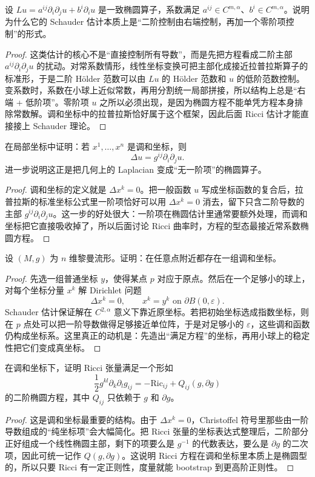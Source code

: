 \documentclass[11pt,a4paper,openany]{ctexbook}
\numberwithin{equation}{chapter}
\begin{document}
\begin{problem}
设 \(L u=a^{ij}\partial_i\partial_j u+b^i\partial_i u\) 是一致椭圆算子，系数满足 \(a^{ij}\in C^{m,\alpha}\)、\(b^i\in C^{m,\alpha}\)。说明为什么它的 Schauder 估计本质上是“二阶控制由右端控制，再加一个零阶项控制”的形式。
\end{problem}
\begin{proof}
这类估计的核心不是“直接控制所有导数”，而是先把方程看成二阶主部 \(a^{ij}\partial_i\partial_j u\) 的扰动。对常系数情形，线性坐标变换可把主部化成接近拉普拉斯算子的标准形，于是二阶 Hölder 范数可以由 \(Lu\) 的 Hölder 范数和 \(u\) 的低阶范数控制。变系数时，系数在小球上近似常数，再用分割统一局部拼接，所以结构上总是“右端 + 低阶项”。零阶项 \(u\) 之所以必须出现，是因为椭圆方程不能单凭方程本身排除常数解。调和坐标中的拉普拉斯恰好属于这个框架，因此后面 Ricci 估计才能直接接上 Schauder 理论。  
\end{proof}

\begin{problem}
在局部坐标中证明：若 \(x^1,\dots,x^n\) 是调和坐标，则
\[
\Delta u=g^{ij}\partial_i\partial_j u.
\]
进一步说明这正是把几何上的 Laplacian 变成“无一阶项”的椭圆算子。
\end{problem}
\begin{proof}
调和坐标的定义就是 \(\Delta x^k=0\)。把一般函数 \(u\) 写成坐标函数的复合后，拉普拉斯的标准坐标公式里一阶项恰好可以用 \(\Delta x^k=0\) 消去，留下只含二阶导数的主部 \(g^{ij}\partial_i\partial_j u\)。这一步的好处很大：一阶项在椭圆估计里通常要额外处理，而调和坐标把它直接吸收掉了，所以后面讨论 Ricci 曲率时，方程的型态最接近常系数椭圆方程。  
\end{proof}

\begin{problem}
设 \((M,g)\) 为 \(n\) 维黎曼流形。证明：在任意点附近都存在一组调和坐标。
\end{problem}
\begin{proof}
先选一组普通坐标 \(y\)，使得某点 \(p\) 对应于原点。然后在一个足够小的球上，对每个坐标分量 \(x^k\) 解 Dirichlet 问题
\[
\Delta x^k=0,\qquad x^k=y^k \text{ on } \partial B(0,\varepsilon).
\]
Schauder 估计保证解在 \(C^{2,\alpha}\) 意义下靠近原坐标。若把初始坐标选成指数坐标，则在 \(p\) 点处可以把一阶导数做得足够接近单位阵，于是对足够小的 \(\varepsilon\)，这些调和函数仍构成坐标系。这里真正的动机是：先造出“满足方程”的坐标，再用小球上的稳定性把它们变成真坐标。  
\end{proof}

\begin{problem}
在调和坐标下，证明 Ricci 张量满足一个形如
\[
\frac12 g^{kl}\partial_k\partial_l g_{ij}= -\mathrm{Ric}_{ij}+Q_{ij}(g,\partial g)
\]
的二阶椭圆方程，其中 \(Q_{ij}\) 只依赖于 \(g\) 和 \(\partial g\)。
\end{problem}
\begin{proof}
这是调和坐标最重要的结构。由于 \(\Delta x^k=0\)，Christoffel 符号里那些由一阶导数组成的“纯坐标项”会大幅简化。把 Ricci 张量的坐标表达式整理后，二阶部分正好组成一个线性椭圆主部，剩下的项要么是 \(g^{-1}\) 的代数表达，要么是 \(\partial g\) 的二次项，因此可统一记作 \(Q(g,\partial g)\)。这说明 Ricci 方程在调和坐标里本质上是椭圆型的，所以只要 Ricci 有一定正则性，度量就能 bootstrap 到更高阶正则性。  
\end{proof}
\end{document}
